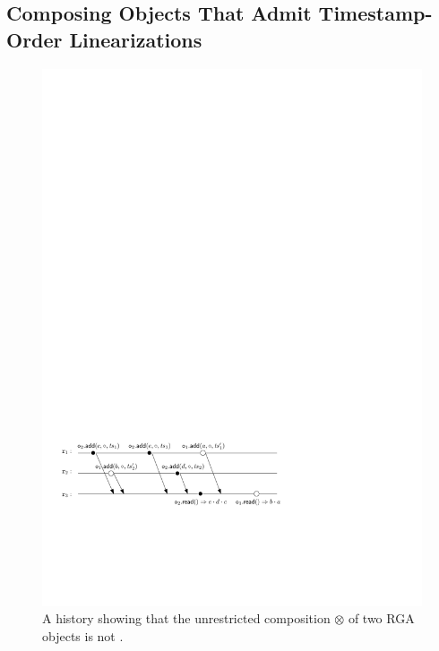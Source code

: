
\subsection{Composing Objects That Admit Timestamp-Order Linearizations}

%

\begin{figure}[t]
  \centering
  \includegraphics[width=0.7 \textwidth]{figures/LWWReg-LWWReg-NoSTS.pdf}
  \caption{A history showing that the unrestricted composition $\otimes$ of two RGA objects is not \crdtlinearizable{}.
  }
  \label{fig:negative_ts_composition}
\end{figure}


